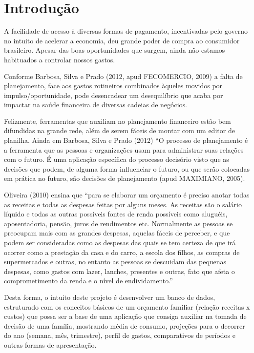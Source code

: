 


\textual

\chapter*[Introdução]{Introdução}

A facilidade de acesso à diversas formas de pagamento, incentivadas pelo governo no intuito de acelerar a economia, deu grande poder de compra ao consumidor brasileiro. Apesar das boas oportunidades que surgem, ainda não estamos habituados a controlar nossos gastos. 

Conforme Barbosa, Silva e Prado (2012, apud FECOMERCIO, 2009) a falta de planejamento, face aos gastos rotineiros combinados àqueles movidos por impulso/oportunidade, pode desencadear um desequilíbrio que acaba por impactar na saúde financeira de diversas cadeias de negócios.

Felizmente, ferramentas que auxiliam no planejamento financeiro estão bem difundidas na grande rede, além de serem fáceis de montar com um editor de planilha.
Ainda em Barbosa, Silva e Prado (2012) “O processo de planejamento é a ferramenta que as pessoas e organizações usam para administrar suas relações com o futuro. É uma aplicação específica do processo decisório visto que as decisões que podem, de alguma forma influenciar o futuro, ou que serão colocadas em prática no futuro, são decisões de planejamento (apud MAXIMIANO, 2005).

Oliveira (2010) ensina que “para se elaborar um orçamento é preciso anotar todas as receitas e todas as despesas feitas por alguns meses. As receitas são o salário líquido e todas as outras possíveis fontes de renda possíveis como aluguéis, aposentadoria, pensão, juros de rendimentos etc. Normalmente as pessoas se preocupam mais com as grandes despesas, aquelas fáceis de perceber, e que podem ser consideradas como as despesas das quais se tem certeza de que irá ocorrer como a prestação da casa e do carro, a escola dos filhos, as compras de supermercados e outras, no entanto as pessoas se descuidam das pequenas despesas, como gastos com lazer, lanches, presentes e outras, fato que afeta o comprometimento da renda e o nível de endividamento.”

Desta forma, o intuito deste projeto é desenvolver um banco de dados, estruturado com os conceitos básicos de um orçamento familiar (relação receitas x custos) que possa ser a base de uma aplicação que consiga auxiliar na tomada de decisão de uma família, mostrando média de consumo, projeções para o decorrer do ano (semana, mês, trimestre), perfil de gastos, comparativos de períodos e outras formas de apresentação.
